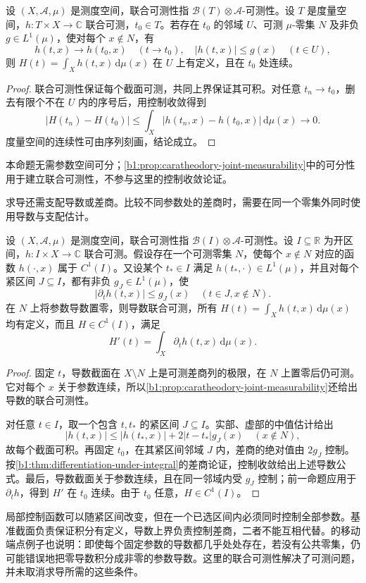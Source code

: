 \begin{proposition}\label{b1:prop:joint-parameter-continuity}
设 \((X,\mathcal A,\mu)\) 是测度空间，联合可测性指 \(\mathcal B(T)\otimes\mathcal A\)-可测性。设 \(T\) 是度量空间，\(h:T\times X\rightarrow\mathbb C\) 联合可测，\(t_0\in T\)。若存在 \(t_0\) 的邻域 \(U\)、可测 \(\mu\)-零集 \(N\) 及非负 \(g\in L^1(\mu)\)，使对每个 \(x\notin N\)，有
\[
h(t,x)\longrightarrow h(t_0,x)\quad(t\to t_0),\quad
|h(t,x)|\leq g(x)\quad(t\in U),
\]
则 \(H(t)=\int_Xh(t,x)\,\mathrm d\mu(x)\) 在 \(U\) 上有定义，且在 \(t_0\) 处连续。
\end{proposition}
\begin{proof}
联合可测性保证每个截面可测，共同上界保证其可积。对任意 \(t_n\to t_0\)，删去有限个不在 \(U\) 内的序号后，用控制收敛得到
\[
|H(t_n)-H(t_0)|\leq\int_X|h(t_n,x)-h(t_0,x)|\,\mathrm d\mu(x)\longrightarrow0.
\]
度量空间的连续性可由序列刻画，结论成立。
\end{proof}

本命题无需参数空间可分；\cref{b1:prop:caratheodory-joint-measurability}中的可分性用于建立联合可测性，不参与这里的控制收敛论证。

\ProseParagraphBreak

求导还需支配导数或差商。比较不同参数处的差商时，需要在同一个零集外同时使用导数与支配估计。

\begin{theorem}\label{b1:thm:joint-parameter-differentiation}
设 \((X,\mathcal A,\mu)\) 是测度空间，联合可测性指 \(\mathcal B(I)\otimes\mathcal A\)-可测性。设 \(I\subseteq\mathbb R\) 为开区间，\(h:I\times X\rightarrow\mathbb C\) 联合可测。假设存在一个可测零集 \(N\)，使每个 \(x\notin N\) 对应的函数 \(h(\cdot,x)\) 属于 \(C^1(I)\)。又设某个 \(t_*\in I\) 满足 \(h(t_*,\cdot)\in L^1(\mu)\)，并且对每个紧区间 \(J\subseteq I\)，都有非负 \(g_J\in L^1(\mu)\)，使
\[
|\partial_th(t,x)|\leq g_J(x)\quad(t\in J, x\notin N).
\]
在 \(N\) 上将参数导数置零，则导数联合可测，所有 \(H(t)=\int_Xh(t,x)\,\mathrm d\mu(x)\) 均有定义，而且 \(H\in C^1(I)\)，满足
\[
H'(t)=\int_X\partial_th(t,x)\,\mathrm d\mu(x).
\]
\end{theorem}
\begin{proof}
固定 \(t\)，导数截面在 \(X\setminus N\) 上是可测差商列的极限，在 \(N\) 上置零后仍可测。它对每个 \(x\) 关于参数连续，所以\cref{b1:prop:caratheodory-joint-measurability}还给出导数的联合可测性。

对任意 \(t\in I\)，取一个包含 \(t,t_*\) 的紧区间 \(J\subseteq I\)。实部、虚部的中值估计给出
\[
|h(t,x)|\leq|h(t_*,x)|+2|t-t_*|g_J(x)\quad(x\notin N),
\]
故每个截面可积。再固定 \(t_0\)，在其紧区间邻域 \(J\) 内，差商的绝对值由 \(2g_J\) 控制。按\cref{b1:thm:differentiation-under-integral}的差商论证，控制收敛给出上述导数公式。最后，导数截面关于参数连续，且在同一邻域内受 \(g_J\) 控制；前一命题应用于 \(\partial_th\)，得到 \(H'\) 在 \(t_0\) 连续。由于 \(t_0\) 任意，\(H\in C^1(I)\)。
\end{proof}

局部控制函数可以随紧区间改变，但在一个已选区间内必须同时控制全部参数。基准截面负责保证积分有定义，导数上界负责控制差商，二者不能互相代替。的移动端点例子也说明：即使每个固定参数的导数都几乎处处存在，若没有公共零集，仍可能错误地把零导数积分成非零的参数导数。这里的联合可测性解决了可测问题，并未取消求导所需的这些条件。
